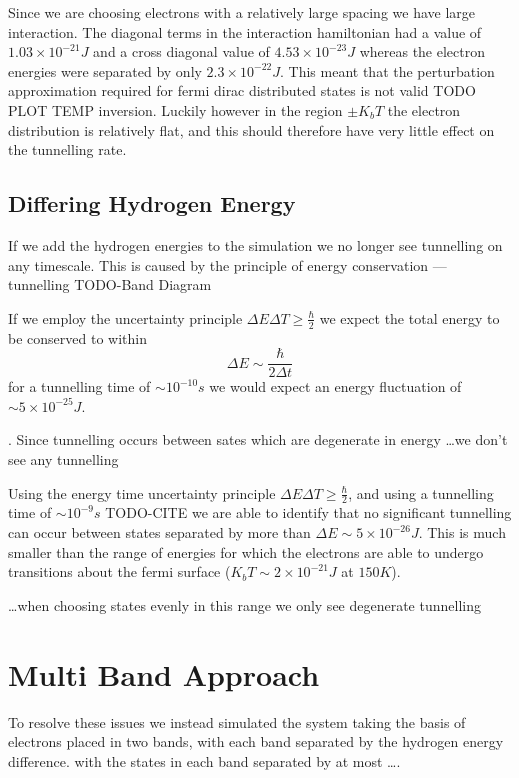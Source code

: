 Since we are choosing electrons
with a relatively large spacing
we have large
interaction. The diagonal terms in
the interaction hamiltonian
had a value of \(1.03\times{}10^{-21}J\)
and a cross diagonal value of \(4.53\times{}10^{-23}J\)
whereas the electron energies were separated
by only \(2.3\times{}10^{-22}J\). This meant that
the perturbation approximation required for
fermi dirac distributed states is not valid TODO PLOT TEMP inversion.
Luckily however in the region \(\pm K_b T\)
the electron distribution is relatively flat,
and this should therefore have very little
effect on the tunnelling rate.

\subsection{Differing Hydrogen Energy}
If we add the hydrogen energies to the
simulation we no longer see tunnelling
on any timescale. This is caused by the
principle of energy conservation --- tunnelling
TODO-Band Diagram

If we employ the uncertainty principle
\(\Delta{}E\Delta{}T \geq \frac{\hbar}{2}\)
we expect the total energy to be conserved
to within
\begin{equation}
    \Delta{}E \sim \frac{\hbar}{2\Delta{} t}
\end{equation}
for a tunnelling time of \(\sim 10^{-10}s\)
we would expect an energy fluctuation
of \(\sim 5\times{}10^{-25} J\).


. Since tunnelling occurs between sates which are
degenerate in energy \ldots we don't see any tunnelling

Using the energy time uncertainty principle
\(\Delta{}E\Delta{}T \geq \frac{\hbar}{2}\), and
using a tunnelling time of \(\sim 10^{-9}s\) TODO-CITE
we are able to identify that no significant tunnelling
can occur between states separated by more than
\(\Delta{}E \sim 5\times{}10^{-26} J\). This is
much smaller than the range of energies for
which the electrons are able to undergo
transitions about the fermi surface
(\(K_b T \sim 2 \times 10^{-21}J\) at \(150K\)).


\ldots when choosing states evenly in this
range we only see degenerate tunnelling

\section{Multi Band Approach}
To resolve these issues we instead simulated the system
taking the basis of electrons placed in two bands,
with each band separated by the hydrogen energy
difference.
with
the states in each band separated by at most \ldots.


